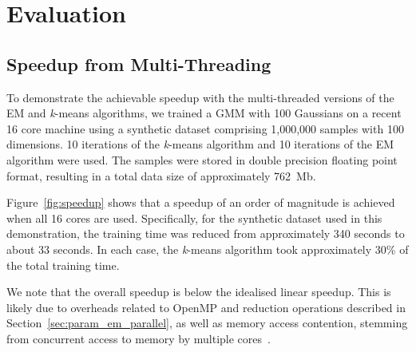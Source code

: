 \section{Evaluation}
\label{sec:eval}

\subsection{Speedup from Multi-Threading}

To demonstrate the achievable speedup with the multi-threaded versions of the EM and {\it k}-means algorithms,
we trained a GMM with 100 Gaussians on a recent 16 core machine using a synthetic dataset comprising 1,000,000 samples with 100 dimensions.
10 iterations of the {\it k}-means algorithm and 10 iterations of the EM algorithm were used.
The samples were stored in double precision floating point format, resulting in a total data size of approximately 762~Mb.

Figure~\ref{fig:speedup} shows that a speedup of an order of magnitude is achieved when all 16 cores are used.
Specifically, for the synthetic dataset used in this demonstration,
the training time was reduced from approximately 340 seconds to about 33 seconds.
In each case, the {\it k}-means algorithm took approximately 30\% of the total training time.

We note that the overall speedup is below the idealised linear speedup.
This is likely due to overheads related to OpenMP and reduction operations described in Section~\ref{sec:param_em_parallel},
as well as memory access contention, stemming from concurrent access to memory by multiple cores~\cite{McCool_2012}.

